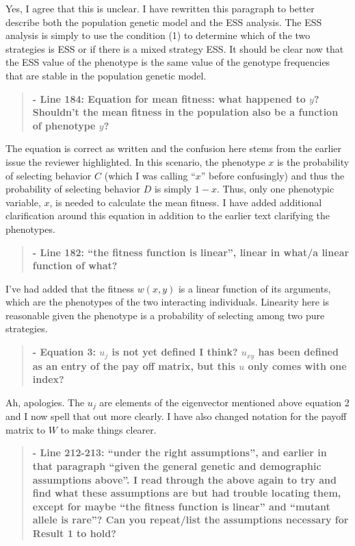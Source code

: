 \documentclass[10pt,parskip=full,foldmarks=off,addrfield=off,backaddress=false,refline=dateleft,letterpaper]{scrlttr2}
\newenvironment{reviewerquote}{\begin{quote}\color{DarkBlue}\bfseries}{\end{quote}}
\begin{document}
\begin{letter}
Yes, I agree that this is unclear. I have rewritten this paragraph to better describe both the population genetic model and the ESS analysis. The ESS analysis is simply to use the condition (1) to determine which of the two strategies is ESS or if there is a mixed strategy ESS. It should be clear now that the ESS value of the phenotype is the same value of the genotype frequencies that are stable in the population genetic model.

\begin{reviewerquote}
  - Line 184: Equation for mean fitness: what happened to $y$? Shouldn’t the mean fitness in the population also be a function of phenotype $y$?
\end{reviewerquote}

The equation is correct as written and the confusion here stems from the earlier issue the reviewer highlighted. In this scenario, the phenotype $x$ is the probability of selecting behavior $C$ (which I was calling ``$x$'' before confusingly) and thus the probability of selecting behavior $D$ is simply $1-x$. Thus, only one phenotypic variable, $x$, is needed to calculate the mean fitness. I have added additional clarification around this equation in addition to the earlier text clarifying the phenotypes.

\begin{reviewerquote}
  - Line 182: “the fitness function is linear”, linear in what/a linear function of what?
\end{reviewerquote}

I've had added that the fitness $w(x,y)$ is a linear function of its arguments, which are the phenotypes of the two interacting individuals. Linearity here is reasonable given the phenotype is a probability of selecting among two pure strategies.

\begin{reviewerquote}
  - Equation 3: $u_j$ is not yet defined I think? $u_{xy}$ has been defined as an entry of the pay off matrix, but this $u$ only comes with one index?
\end{reviewerquote}

Ah, apologies. The $u_{j}$ are elements of the eigenvector mentioned above equation 2 and I now spell that out more clearly. I have also changed notation for the payoff matrix to $W$ to make things clearer.

\begin{reviewerquote}
  - Line 212-213: “under the right assumptions”, and earlier in that paragraph “given the general genetic and demographic assumptions above”. I read through the above again to try and find what these assumptions are but had trouble locating them, except for maybe “the fitness function is linear” and “mutant allele is rare”? Can you repeat/list the assumptions necessary for Result 1 to hold?
\end{reviewerquote}


\end{letter}
\end{document}
